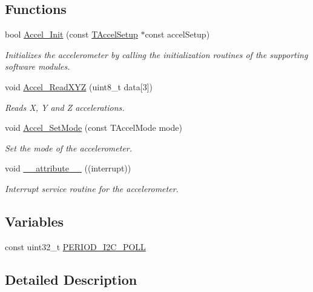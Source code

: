 \subsection*{Functions}
\begin{DoxyCompactItemize}
\item 
bool \hyperlink{group__accel__module_gad5a20dbb7475bf6023e591d6a4e7312d}{Accel\+\_\+\+Init} (const \hyperlink{struct_t_accel_setup}{T\+Accel\+Setup} $\ast$const accel\+Setup)
\begin{DoxyCompactList}\small\item\em Initializes the accelerometer by calling the initialization routines of the supporting software modules. \end{DoxyCompactList}\item 
void \hyperlink{group__accel__module_ga8cc8e053f2474e24cb761f1de0f769d8}{Accel\+\_\+\+Read\+X\+Y\+Z} (uint8\+\_\+t data\mbox{[}3\mbox{]})
\begin{DoxyCompactList}\small\item\em Reads X, Y and Z accelerations. \end{DoxyCompactList}\item 
void \hyperlink{group__accel__module_ga4f26113eba1169f1d886f8236626f4a7}{Accel\+\_\+\+Set\+Mode} (const T\+Accel\+Mode mode)
\begin{DoxyCompactList}\small\item\em Set the mode of the accelerometer. \end{DoxyCompactList}\item 
void \hyperlink{group__accel__module_ga445500277ba0e363873b34cffc015745}{\+\_\+\+\_\+attribute\+\_\+\+\_\+} ((interrupt))
\begin{DoxyCompactList}\small\item\em Interrupt service routine for the accelerometer. \end{DoxyCompactList}\end{DoxyCompactItemize}
\subsection*{Variables}
\begin{DoxyCompactItemize}
\item 
const uint32\+\_\+t \hyperlink{group__accel__module_ga4b8052f26442dadff956fa68b94b62f2}{P\+E\+R\+I\+O\+D\+\_\+\+I2\+C\+\_\+\+P\+O\+L\+L}
\end{DoxyCompactItemize}


\subsection{Detailed Description}


